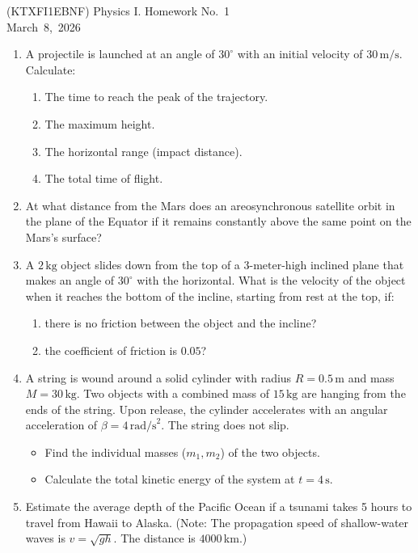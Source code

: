 \documentclass[a4paper,12pt]{letter}
\begin{document}
\begin{center}
 (KTXFI1EBNF) Physics I.  Homework No.~1\\ \smallskip
March~8,~2026
 \end{center}

\begin{enumerate}

\item A projectile is launched at an angle of $30^\circ$ with an initial velocity of $30\,\text{m/s}$. 
Calculate:
\begin{enumerate}
    \item[(a)] The time to reach the peak of the trajectory.
    \item[(b)] The maximum height.
    \item[(c)] The horizontal range (impact distance).
    \item[(d)] The total time of flight.
\end{enumerate}

\item At what distance from the Mars does an areosynchronous satellite orbit in the plane of the Equator if it remains constantly above the same point on the Mars's surface?

\item A $2\,\text{kg}$ object slides down from the top of a $3\text{-meter-high}$ inclined plane that makes an angle of $30^\circ$ with the horizontal. What is the velocity of the object when it reaches the bottom of the incline, starting from rest at the top, if:
\begin{enumerate}
    \item[(a)] there is no friction between the object and the incline?
    \item[(b)] the coefficient of friction is $0.05$?
\end{enumerate}

\item A string is wound around a solid cylinder with radius $R = 0.5\,\text{m}$ and mass $M = 30\,\text{kg}$. Two objects with a combined mass of $15\,\text{kg}$ are hanging from the ends of the string. Upon release, the cylinder accelerates with an angular acceleration of $\beta = 4\,\text{rad/s}^2$. The string does not slip.
\begin{itemize}
    \item[(a)] Find the individual masses ($m_1, m_2$) of the two objects.
    \item[(b)] Calculate the total kinetic energy of the system at $t = 4\,\text{s}$.
\end{itemize}

\item Estimate the average depth of the Pacific Ocean if a tsunami takes 5 hours to travel from Hawaii to Alaska. (Note: The propagation speed of shallow-water waves is $v=\sqrt{gh}$. The distance is $4000$\,km.)


\end{enumerate}

  
\bigskip


\vfill
\end{document}
